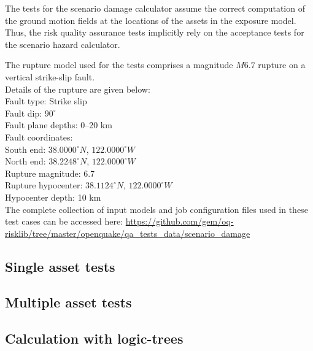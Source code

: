 The tests for the scenario damage calculator assume the correct computation of the ground motion fields at the locations of the assets in the exposure model. Thus, the risk quality assurance tests implicitly rely on the acceptance tests for the scenario hazard calculator.

The rupture model used for the tests comprises a magnitude $M6.7$ rupture on a vertical strike-slip fault.\\

\noindent Details of the rupture are given below:\\

\noindent
Fault type: Strike slip\\
Fault dip: $90^{\circ}$\\
Fault plane depths: 0--20 km\\
Fault coordinates:\\
South end: $38.0000^{\circ} N$, $122.0000^{\circ} W$\\
North end: $38.2248^{\circ} N$, $122.0000^{\circ} W$\\
Rupture magnitude: 6.7\\
Rupture hypocenter: $38.1124^{\circ} N$, $122.0000^{\circ} W$\\
Hypocenter depth: 10 km\\

The complete collection of input models and job configuration files used in these test cases can be accessed here:
\href{https://github.com/gem/oq-risklib/tree/master/openquake/qa_tests_data/scenario_damage}
{https://github.com/gem/oq-risklib/tree/master/openquake/qa\_tests\_data/scenario\_damage}

\subsection{Single asset tests}
\label{subsec:acc-sd-single}


\subsection{Multiple asset tests}
\label{subsec:acc-sd-multiple}


\subsection{Calculation with logic-trees}
\label{subsec:acc-sd-lt}

